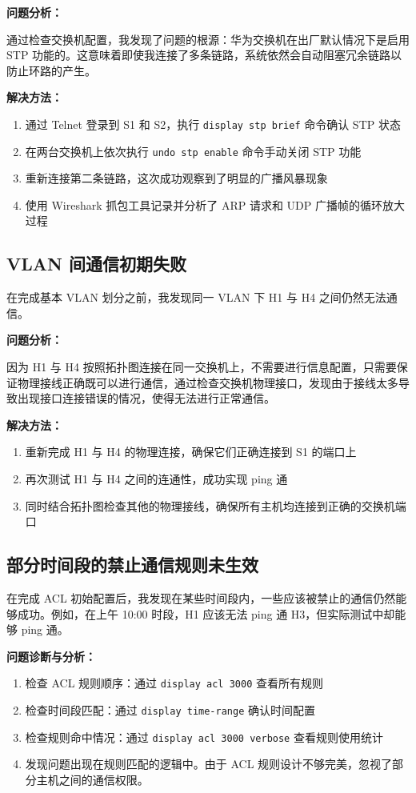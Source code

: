 \documentclass[a4paper]{article}
\begin{document}
\textbf{问题分析：}

通过检查交换机配置，我发现了问题的根源：华为交换机在出厂默认情况下是启用 STP 功能的。这意味着即使我连接了多条链路，系统依然会自动阻塞冗余链路以防止环路的产生。

\textbf{解决方法：}
\begin{enumerate}
\item 通过 Telnet 登录到 S1 和 S2，执行 \texttt{display stp brief} 命令确认 STP 状态
\item 在两台交换机上依次执行 \texttt{undo stp enable} 命令手动关闭 STP 功能
\item 重新连接第二条链路，这次成功观察到了明显的广播风暴现象
\item 使用 Wireshark 抓包工具记录并分析了 ARP 请求和 UDP 广播帧的循环放大过程
\end{enumerate}

\subsection{VLAN 间通信初期失败}

在完成基本 VLAN 划分之前，我发现同一 VLAN 下 H1 与 H4 之间仍然无法通信。

\textbf{问题分析：}

因为 H1 与 H4 按照拓扑图连接在同一交换机上，不需要进行信息配置，只需要保证物理接线正确既可以进行通信，通过检查交换机物理接口，发现由于接线太多导致出现接口连接错误的情况，使得无法进行正常通信。

\textbf{解决方法：}
\begin{enumerate}
\item 重新完成 H1 与 H4 的物理连接，确保它们正确连接到 S1 的端口上
\item 再次测试 H1 与 H4 之间的连通性，成功实现 ping 通
\item 同时结合拓扑图检查其他的物理接线，确保所有主机均连接到正确的交换机端口
\end{enumerate}

\subsection{部分时间段的禁止通信规则未生效}

在完成 ACL 初始配置后，我发现在某些时间段内，一些应该被禁止的通信仍然能够成功。例如，在上午 10:00 时段，H1 应该无法 ping 通 H3，但实际测试中却能够 ping 通。

\textbf{问题诊断与分析：}
\begin{enumerate}
\item 检查 ACL 规则顺序：通过 \texttt{display acl 3000} 查看所有规则
\item 检查时间段匹配：通过 \texttt{display time-range} 确认时间配置
\item 检查规则命中情况：通过 \texttt{display acl 3000 verbose} 查看规则使用统计
\item 发现问题出现在规则匹配的逻辑中。由于 ACL 规则设计不够完美，忽视了部分主机之间的通信权限。
\end{enumerate}
\end{document}
